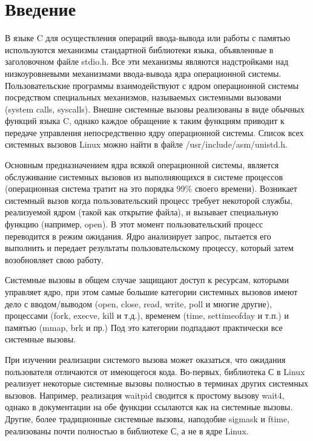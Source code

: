 \newpage
\section*{Введение}

В языке C для осуществления операций ввода-вывода или работы с памятью используются механизмы стандартной библиотеки языка, объявленные в заголовочном файле stdio.h. Все эти механизмы являются надстройками над низкоуровневыми механизмами ввода-вывода ядра операционной системы. Пользовательские программы взаимодействуют с ядром операционной системы посредством специальных механизмов, называемых системными вызовами (system calls, syscalls). Внешне системные вызовы реализованы в виде обычных функций языка C, однако каждое обращение к таким функциям приводит к передаче управления непосредственно ядру операционной системы. Список всех системных вызовов Linux можно найти в файле /usr/include/asm/unistd.h\cite{IvanovN}.

Основным предназначением ядра всякой операционной системы, является обслуживание системных вызовов из выполняющихся в системе процессов (операционная система тратит на это порядка 99\% своего времени)\cite{Cilyuric}. Возникает системный вызов когда пользовательский процесс требует некоторой службы, реализуемой ядром (такой как открытие файла), и вызывает специальную функцию (например, open). В этот момент пользовательский процесс переводится в режим ожидания. Ядро анализирует запрос, пытается его выполнить и передает результаты пользовательскому процессу, который затем возобновляет свою работу. 

Системные вызовы в общем случае защищают доступ к ресурсам, которыми управляет ядро, при этом самые большие категории системных вызовов имеют дело с вводом/выводом (open, close, read, write, poll и многие другие), процессами (fork, execve, kill и т.д.), временем (time, settimeofday и т.п.) и памятью (mmap, brk и пр.) Под это категории подпадают практически все системные вызовы\cite{Maxwell}.

При изучении реализации системого вызова может оказаться, что ожидания пользователя отличаются от имеющегося кода. Во-первых, библиотека С в Linux реализует некоторые системные вызовы полностью в терминах других системных вызовов. Например, реализация waitpid сводится к простому вызову wait4, однако в документации на обе функции ссылаются как на системные вызовы. Другие, более традиционные системные вызовы, наподобие sigmask и ftime, реализованы почти полностью в библиотеке С, а не в ядре Linux.

